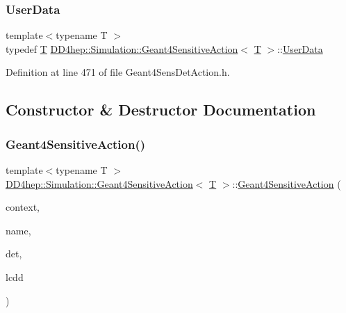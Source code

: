 \subsubsection{\texorpdfstring{User\+Data}{UserData}}
{\footnotesize\ttfamily template$<$typename T $>$ \\
typedef \hyperlink{class_t}{T} \hyperlink{class_d_d4hep_1_1_simulation_1_1_geant4_sensitive_action}{D\+D4hep\+::\+Simulation\+::\+Geant4\+Sensitive\+Action}$<$ \hyperlink{class_t}{T} $>$\+::\hyperlink{class_d_d4hep_1_1_simulation_1_1_geant4_sensitive_action_a1aa349c02363cf7471a043ad5f3b95c9}{User\+Data}}



Definition at line 471 of file Geant4\+Sens\+Det\+Action.\+h.



\subsection{Constructor \& Destructor Documentation}
\hypertarget{class_d_d4hep_1_1_simulation_1_1_geant4_sensitive_action_ae1ede070242c666b523a1bb28a19a8f5}{}\label{class_d_d4hep_1_1_simulation_1_1_geant4_sensitive_action_ae1ede070242c666b523a1bb28a19a8f5} 
\subsubsection{\texorpdfstring{Geant4\+Sensitive\+Action()}{Geant4SensitiveAction()}}
{\footnotesize\ttfamily template$<$typename T $>$ \\
\hyperlink{class_d_d4hep_1_1_simulation_1_1_geant4_sensitive_action}{D\+D4hep\+::\+Simulation\+::\+Geant4\+Sensitive\+Action}$<$ \hyperlink{class_t}{T} $>$\+::\hyperlink{class_d_d4hep_1_1_simulation_1_1_geant4_sensitive_action}{Geant4\+Sensitive\+Action} (\begin{DoxyParamCaption}\item[{\hyperlink{class_d_d4hep_1_1_simulation_1_1_geant4_context}{Geant4\+Context} $\ast$}]{context,  }\item[{const std\+::string \&}]{name,  }\item[{\hyperlink{class_d_d4hep_1_1_geometry_1_1_det_element}{Geometry\+::\+Det\+Element}}]{det,  }\item[{\hyperlink{class_d_d4hep_1_1_geometry_1_1_l_c_d_d}{Geometry\+::\+L\+C\+DD} \&}]{lcdd }\end{DoxyParamCaption})}



